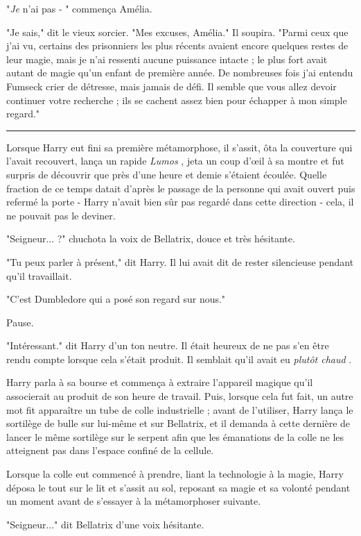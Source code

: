 "\emph{Je}  n'ai pas - " commença Amélia.

"Je sais," dit le vieux sorcier. "Mes excuses, Amélia." Il soupira. "Parmi ceux que j'ai vu, certains des prisonniers les plus récents avaient encore quelques restes de leur magie, mais je n'ai ressenti aucune puissance intacte ; le plus fort avait autant de magie qu'un enfant de première année. De nombreuses fois j'ai entendu Fumseck crier de détresse, mais jamais de défi. Il semble que vous allez devoir continuer votre recherche ; ils se cachent assez bien pour échapper à mon simple regard."
\par\noindent\rule{\textwidth}{0.4pt}
Lorsque Harry eut fini sa première métamorphose, il s'assit, ôta la couverture qui l'avait recouvert, lança un rapide \emph{Lumos} , jeta un coup d'œil à sa montre et fut surpris de découvrir que près d'une heure et demie s'étaient écoulée. Quelle fraction de ce temps datait d'après le passage de la personne qui avait ouvert puis refermé la porte - Harry n'avait bien sûr pas regardé dans cette direction - cela, il ne pouvait pas le deviner.

"Seigneur... ?" chuchota la voix de Bellatrix, douce et très hésitante.

"Tu peux parler à présent," dit Harry. Il lui avait dit de rester silencieuse pendant qu'il travaillait.

"C'est Dumbledore qui a posé son regard sur nous."

Pause.

"Intéressant." dit Harry d'un ton neutre. Il était heureux de ne pas s'en être rendu compte lorsque cela s'était produit. Il semblait qu'il avait eu \emph{plutôt chaud} .

Harry parla à sa bourse et commença à extraire l'appareil magique qu'il associerait au produit de son heure de travail. Puis, lorsque cela fut fait, un autre mot fit apparaître un tube de colle industrielle ; avant de l'utiliser, Harry lança le sortilège de bulle sur lui-même et sur Bellatrix, et il demanda à cette dernière de lancer le même sortilège sur le serpent afin que les émanations de la colle ne les atteignent pas dans l'espace confiné de la cellule.

Lorsque la colle eut commencé à prendre, liant la technologie à la magie, Harry déposa le tout sur le lit et s'assit au sol, reposant sa magie et sa volonté pendant un moment avant de s'essayer à la métamorphoser suivante.

"Seigneur..." dit Bellatrix d'une voix hésitante.

